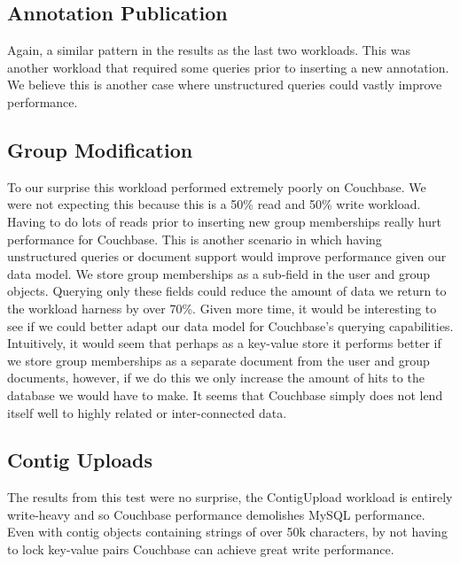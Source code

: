 \documentclass[10pt, conference, compsocconf]{IEEEtran}
\begin{document}
\subsection{Annotation Publication}
Again, a similar pattern in the results as the last two workloads. This was
another workload that required some queries prior to inserting a new
annotation. We believe this is another case where unstructured queries could
vastly improve performance.

\subsection{Group Modification}
To our surprise this workload performed extremely poorly on Couchbase. We were not
expecting this because this is a 50\% read and 50\% write workload. Having to
do lots of reads prior to inserting new group memberships really hurt
performance for Couchbase. This is another scenario in which having unstructured queries or
document support would improve performance given our data model. We store group
memberships as a sub-field in the user and group objects. Querying only
these fields could reduce the amount of data we return to the workload
harness by over 70\%. Given more time, it would be interesting to see if we
could better adapt our data model for Couchbase's querying capabilities.
Intuitively, it would seem that perhaps as a key-value store it performs better if we store group
memberships as a separate document from the user and group documents, however,
if we do this we only increase the amount of hits to the database we would have
to make. It seems that Couchbase simply does not lend itself well to highly
related or inter-connected data.

\subsection{Contig Uploads}
The results from this test were no surprise, the ContigUpload workload is
entirely write-heavy and so Couchbase performance demolishes MySQL performance.
Even with contig objects containing strings of over 50k characters, by not
having to lock key-value pairs Couchbase can achieve great write performance.
\end{document}
